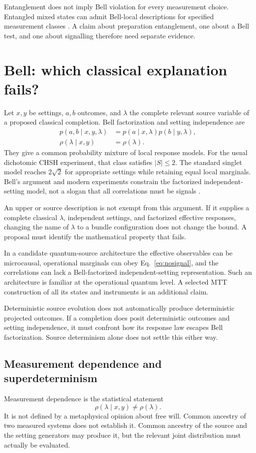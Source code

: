 \documentclass[11pt,a4paper]{article}
\begin{document}
Entanglement does not imply Bell violation for every measurement choice. Entangled mixed states can admit Bell-local descriptions for specified measurement classes \cite{Werner}. A claim about preparation entanglement, one about a Bell test, and one about signalling therefore need separate evidence.

\section{Bell: which classical explanation fails?}
\label{sec:bell}
Let \(x,y\) be settings, \(a,b\) outcomes, and \(\lambda\) the complete relevant source variable of a proposed classical completion. Bell factorization and setting independence are
\begin{align}
p(a,b\mid x,y,\lambda)&=p(a\mid x,\lambda)p(b\mid y,\lambda),\\
\rho(\lambda\mid x,y)&=\rho(\lambda).
\end{align}
They give a common probability mixture of local response models. For the usual dichotomic CHSH experiment, that class satisfies \(|S|\leq2\). The standard singlet model reaches \(2\sqrt2\) for appropriate settings while retaining equal local marginals. Bell's argument and modern experiments constrain the factorized independent-setting model, not a slogan that all correlations must be signals \cite{Bell,Hensen}.

An upper or source description is not exempt from this argument. If it supplies a complete classical \(\lambda\), independent settings, and factorized effective responses, changing the name of \(\lambda\) to a bundle configuration does not change the bound. A proposal must identify the mathematical property that fails.

In a candidate quantum-source architecture the effective observables can be microcausal, operational marginals can obey Eq.~\eqref{eq:nosignal}, and the correlations can lack a Bell-factorized independent-setting representation. Such an architecture is familiar at the operational quantum level. A selected MTT construction of all its states and instruments is an additional claim.

Deterministic source evolution does not automatically produce deterministic projected outcomes. If a completion does posit deterministic outcomes and setting independence, it must confront how its response law escapes Bell factorization. Source determinism alone does not settle this either way.

\subsection{Measurement dependence and superdeterminism}
Measurement dependence is the statistical statement
\begin{equation}
\rho(\lambda\mid x,y)\ne\rho(\lambda).
\end{equation}
It is not defined by a metaphysical opinion about free will. Common ancestry of two measured systems does not establish it. Common ancestry of the source and the setting generators may produce it, but the relevant joint distribution must actually be evaluated.
\end{document}
